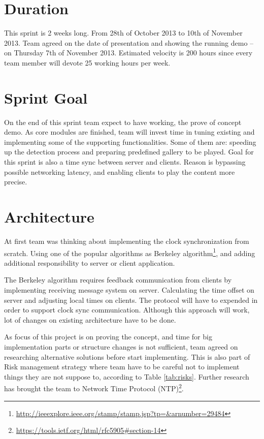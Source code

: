 

\section{Duration}
This sprint is 2 weeks long. From 28th of October 2013 to 10th of November 2013. 
Team agreed on the date of presentation and showing the running demo – on Thursday 7th of November 2013.
Estimated velocity is 200 hours since every team member will devote 25 working hours per week.


\section{Sprint Goal}

On the end of this sprint team expect to have working, the prove of concept demo. As core modules are finished, team will invest time in tuning existing and implementing some of the supporting functionalities. Some of them are: speeding up the detection process  and preparing predefined gallery to be played. Goal for this sprint is also a time sync between server and clients. Reason is bypassing possible networking latency, and enabling clients to play the content more precise. 

\section{Architecture}

At first team was thinking about implementing the clock synchronization from scratch. Using one of the popular algorithms as Berkeley algorithm\footnote{\url{http://ieeexplore.ieee.org/stamp/stamp.jsp?tp=\&arnumber=29484}}, and adding additional responsibility to server or client application. 

The Berkeley algorithm requires feedback communication from clients by implementing receiving message system on server. Calculating the time offset on server and adjusting local times on clients. The protocol will have to expended in order to support clock sync communication. Although this approach will work, lot of changes on existing architecture have to be done.

As focus of this project is on proving the concept, and time for big implementation parts or structure changes is not sufficient, team agreed on researching alternative solutions before start implementing. This is also part of Risk management strategy where team have to be careful not to implement things they are not suppose to, according to Table \ref{tab:risks}. Further research has brought the team to Network Time Protocol (NTP)\footnote{\url{https://tools.ietf.org/html/rfc5905\#section-14}}.

